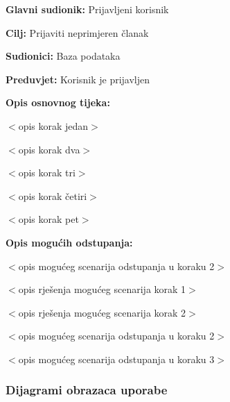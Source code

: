 \noindent {}
\begin{packed_item}

\item \textbf{Glavni sudionik:} Prijavljeni korisnik
\item  \textbf{Cilj:} Prijaviti neprimjeren članak
\item  \textbf{Sudionici:} Baza podataka
\item  \textbf{Preduvjet:} Korisnik je prijavljen
\item  \textbf{Opis osnovnog tijeka:}

\item[] \begin{packed_enum}

    \item $<$opis korak jedan$>$
    \item $<$opis korak dva$>$
    \item $<$opis korak tri$>$
    \item $<$opis korak četiri$>$
    \item $<$opis korak pet$>$

\end{packed_enum}

\item  \textbf{Opis mogućih odstupanja:}

\item[] \begin{packed_item}

    \item[2.a] $<$opis mogućeg scenarija odstupanja u koraku 2$>$
    \item[] \begin{packed_enum}

        \item $<$opis rješenja mogućeg scenarija korak 1$>$
        \item $<$opis rješenja mogućeg scenarija korak 2$>$

    \end{packed_enum}

\item[2.b] $<$opis mogućeg scenarija odstupanja u koraku 2$>$
\item[3.a] $<$opis mogućeg scenarija odstupanja  u koraku 3$>$

\end{packed_item}
\end{packed_item}

\subsubsection{Dijagrami obrazaca uporabe}

